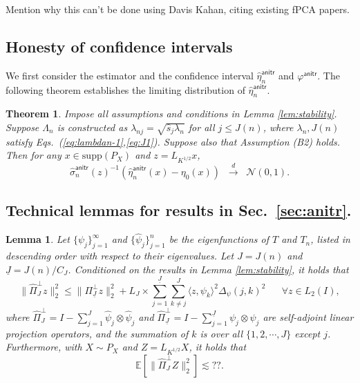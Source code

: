 \documentclass[11pt,a4paper]{article}
\renewcommand{\hat}{\widehat}
\theoremstyle{definition}
\theoremstyle{plain}
\newtheorem{theorem}{Theorem}[section]
\newtheorem{lemma}{Lemma}[section]
\theoremstyle{remark}
\newcommand{\supp}{\mathrm{supp}}
\newcommand{\anitr}{\mathsf{anitr}}
\newcommand{\und}{\underline}
\begin{document}
{\color{red} Mention why this can't be done using Davis Kahan, citing existing fPCA papers.}

\subsection{Honesty of confidence intervals}

We first consider the estimator and the confidence interval $\hat\eta_n^\anitr$ and $\varphi^\anitr$. The following theorem establishes the limiting distribution of $\hat\eta_n^\anitr$.
\begin{theorem}
Impose all assumptions and conditions in Lemma \ref{lem:stability}. Suppose $\Lambda_n$ is constructed as $\lambda_{nj}=\sqrt{\hat s_j\lambda_n}$ for all $j\leq J(n)$,
where $\lambda_n,J(n)$ satisfy Eqs.~(\ref{eq:lambdan-1},\ref{eq:J1}). Suppose also that Assumption (B2) holds. Then for any $x\in\supp(P_X)$ and $z=L_{K^{1/2}}x$, 
$$
\hat\sigma_n^\anitr(z)^{-1}(\hat\eta_n^{\anitr}(x)-\eta_0(x)) \;\;\overset{d}{\to}\;\;\mathcal N(0, 1).
$$
\label{thm:anitr-limiting}
\end{theorem}

\subsection{Technical lemmas for results in Sec.~\ref{sec:anitr}.}

\begin{lemma}
Let $\{\psi_j\}_{j=1}^{\infty}$ and $\{\hat\psi_j\}_{j=1}^n$ be the eigenfunctions of $T$ and $T_n$, listed in descending order with respect to their eigenvalues.
Let $J=J(n)$ and $\und J=J(n)/C_J$.
Conditioned on the results in Lemma \ref{lem:stability}, it holds that
$$
\|\hat\Pi_{J}^\perp z\|_2^2 \leq \|\Pi_{\und J}^\perp z\|_2^2 + L_J\times \sum_{j=1}^{\und J}\sum_{k\neq j}^J\langle z,\psi_k\rangle^2\Delta_\psi(j,k)^2\;\;\;\;\;\;\forall z\in L_2(I),
$$
where $\hat\Pi_{J}^\perp = I-\sum_{j=1}^{J}\hat\psi_j\otimes\hat\psi_j$ and $\hat\Pi_{\und J}^\perp = I-\sum_{j=1}^{\und J}\psi_j\otimes\psi_j$ are self-adjoint linear projection operators,
and the summation of $k$ is over all $\{1,2,\cdots,J\}$ except $j$. Furthermore, with $X\sim P_X$ and $Z=L_{K^{1/2}}X$, it holds that
$$
\mathbb E[\|\hat\Pi_J^\perp Z\|_2^2] \lesssim ??.
$$
\label{lem:truncation}
\end{lemma}
\end{document}
